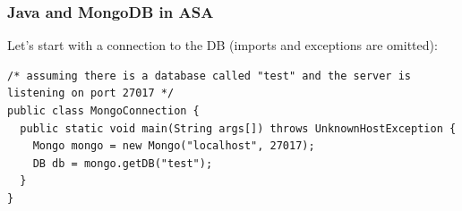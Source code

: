 \subsubsection{Java and MongoDB in ASA}

Let's start with a connection to the DB (imports and exceptions are omitted): 

\newpage
\begin{lstlisting}
/* assuming there is a database called "test" and the server is listening on port 27017 */
public class MongoConnection {
  public static void main(String args[]) throws UnknownHostException {
    Mongo mongo = new Mongo("localhost", 27017);
    DB db = mongo.getDB("test");
  }
}
\end{lstlisting}

% 
% 